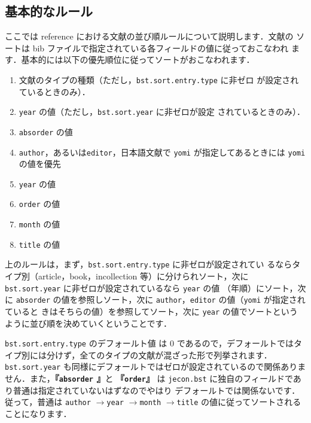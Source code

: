 \documentclass[a4j,10pt]{jarticle}
\begin{document}
\subsection{基本的なルール}

ここでは reference における文献の並び順ルールについて説明します．文献の
ソートは bib ファイルで指定されている各フィールドの値に従っておこなわれ
ます．基本的には以下の優先順位に従ってソートがおこなわれます．
\begin{enumerate}
 \item 文献のタイプの種類（ただし，\texttt{bst.sort.entry.type} に非ゼロ
       が設定されているときのみ）．
 \item \texttt{year} の値（ただし，\texttt{bst.sort.year} に非ゼロが設定
       されているときのみ）．
 \item \texttt{absorder} の値
 \item \texttt{author}，あるいは\texttt{editor}，日本語文献で
       \texttt{yomi} が指定してあるときには \texttt{yomi} の値を優先
 \item \texttt{year} の値
 \item \texttt{order} の値
 \item \texttt{month} の値
 \item \texttt{title} の値
\end{enumerate}

上のルールは，まず，\texttt{bst.sort.entry.type} に非ゼロが設定されてい
るならタイプ別（article，book，incollection 等）に分けられソート，次に 
\texttt{bst.sort.year} に非ゼロが設定されているなら \texttt{year} の値 
（年順）にソート，次に \texttt{absorder} の値を参照しソート，次に 
\texttt{author}，\texttt{editor} の値（\texttt{yomi} が指定されていると
きはそちらの値）を参照してソート，次に \texttt{year} の値でソートという
ように並び順を決めていくということです．

\texttt{bst.sort.entry.type} のデフォールト値 は 0 であるので，デフォールトではタ
イプ別には分けず，全てのタイプの文献が混ざった形で列挙されます．
\texttt{bst.sort.year} も同様にデフォールトではゼロが設定されているので関係ありま
せん．また，\textbf{『\texttt{absorder} 』}と \textbf {『\texttt{order}』} は
\texttt{jecon.bst} に独自のフィールドであり普通は指定されていないはずなのでやはり
デフォールトでは関係ないです．従って，普通は \texttt{author}
$\rightarrow$\texttt{year} $\rightarrow$\texttt{month}
$\rightarrow$\texttt{title} の値に従ってソートされることになります．
\end{document}
